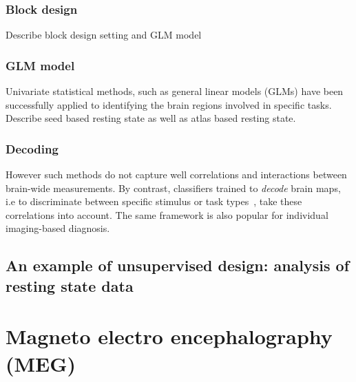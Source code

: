\subsubsection{Block design}
Describe block design setting and GLM model
\subsubsection{GLM model}
Univariate statistical methods, such as general linear models (GLMs)
\cite{friston1995analysis} have been successfully applied to
identifying the brain regions involved in specific tasks.
% 
Describe seed based resting state as well as atlas based resting state.

\subsubsection{Decoding}
However such methods do not capture well correlations and interactions between brain-wide measurements.
By contrast, classifiers trained 
to \emph{decode} brain maps, i.e to discriminate between specific stimulus or task types~\cite{shirer_decoding_2012,varoquaux_how_2014,loula_decoding_2018}, take these correlations into account. 
% 
The same framework is also popular for individual imaging-based diagnosis.

% 
\subsection{An example of unsupervised design: analysis of resting state data}

\section{Magneto electro encephalography (MEG)}
